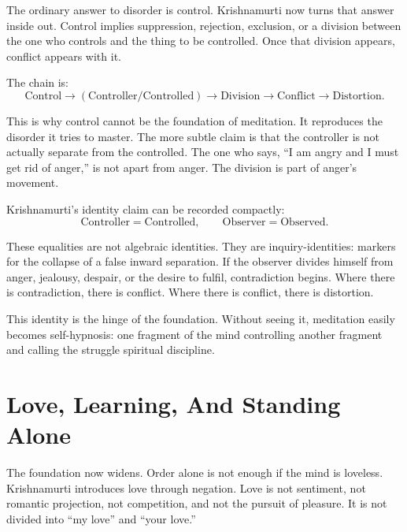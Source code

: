 The ordinary answer to disorder is control. Krishnamurti now turns that answer inside out. Control implies suppression, rejection, exclusion, or a division between the one who controls and the thing to be controlled. Once that division appears, conflict appears with it.

The chain is:
\begin{equation}
\mathrm{Control}
\longrightarrow
(\mathrm{Controller}/\mathrm{Controlled})
\longrightarrow
\mathrm{Division}
\longrightarrow
\mathrm{Conflict}
\longrightarrow
\mathrm{Distortion}.
\end{equation}

This is why control cannot be the foundation of meditation. It reproduces the disorder it tries to master. The more subtle claim is that the controller is not actually separate from the controlled. The one who says, ``I am angry and I must get rid of anger,'' is not apart from anger. The division is part of anger's movement.

Krishnamurti's identity claim can be recorded compactly:
\begin{equation}
\mathrm{Controller}=\mathrm{Controlled},
\qquad
\mathrm{Observer}=\mathrm{Observed}.
\end{equation}

These equalities are not algebraic identities. They are inquiry-identities: markers for the collapse of a false inward separation. If the observer divides himself from anger, jealousy, despair, or the desire to fulfil, contradiction begins. Where there is contradiction, there is conflict. Where there is conflict, there is distortion.

\begin{remark}
This identity is the hinge of the foundation. Without seeing it, meditation easily becomes self-hypnosis: one fragment of the mind controlling another fragment and calling the struggle spiritual discipline.
\end{remark}

\section{Love, Learning, And Standing Alone}

The foundation now widens. Order alone is not enough if the mind is loveless. Krishnamurti introduces love through negation. Love is not sentiment, not romantic projection, not competition, and not the pursuit of pleasure. It is not divided into ``my love'' and ``your love.''

